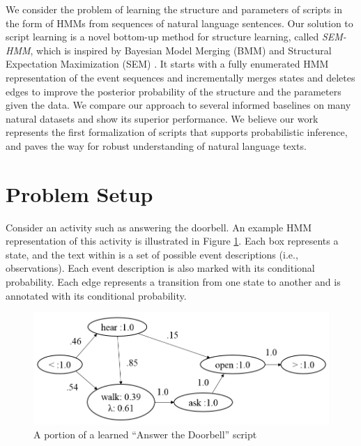 \documentclass[letterpaper]{article}
\begin{document}
We consider the problem of learning the structure and parameters of scripts in the form of HMMs from sequences of natural language sentences. Our solution to script learning is a novel bottom-up method for structure learning, called {\em SEM-HMM}, which is inspired by Bayesian Model Merging (BMM) \cite{stolcke1994best} and Structural Expectation Maximization (SEM)  \cite{friedman1998bayesian}. It starts with a fully enumerated HMM representation of the event sequences and incrementally merges states and deletes edges to improve the posterior probability of the structure and the parameters given the data. We compare our approach to several informed baselines on many natural datasets and show its superior performance. We believe our work represents the first formalization of scripts that supports probabilistic inference, and paves the way for robust understanding of natural language texts. 

\section{Problem Setup} 
\vspace{-.05in}

Consider an activity such as answering the doorbell.  An example HMM representation of this activity is illustrated in Figure \ref{fig:dbscript}.  Each box represents a state, and the text within is a set of possible event descriptions (i.e., observations). Each event description is also marked with its conditional probability.  %
Each edge represents a transition from one state to another and is annotated with its conditional probability.

\begin{figure}
\centering
	\includegraphics[scale=.35]{pretty.png}
\caption{A portion of a learned ``Answer the Doorbell'' script}
\label{fig:dbscript}
\end{figure}
\end{document}
